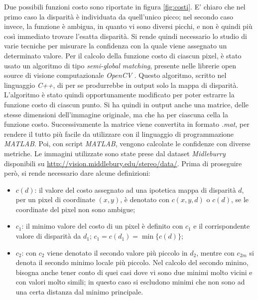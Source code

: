 \documentclass[12pt]{report}
\begin{document}
		\noindent Due possibili funzioni costo sono riportate in figura \ref{fig:costi}. E' chiaro che nel primo caso la disparità  è individuata da quell'unico picco; nel secondo caso invece, la funzione è ambigua, in quanto vi sono diversi picchi, e non è quindi più così immediato trovare l'esatta disparità. Si rende quindi necessario lo studio di varie tecniche per misurare la confidenza con la quale viene assegnato un determinato valore. Per il calcolo della funzione costo di ciascun pixel, è stato usato un algoritmo di tipo \textit{semi-global matching}, presente nelle librerie open source di visione computazionale \textit{OpenCV} \cite{opencv}. Questo algoritmo, scritto nel linguaggio \textit{C++}, di per se produrrebbe in output solo la mappa di disparità. L'algoritmo è stato quindi opportunamente modificato per poter estrarre la funzione costo di ciascun punto. Si ha quindi in output anche una matrice, delle stesse dimensioni dell'immagine originale, ma che ha per ciascuna cella la funzione costo. Successivamente la matrice viene convertita in formato \textit{.mat}, per rendere il tutto più facile da utilizzare con il linguaggio di programmazione \textit{MATLAB}. Poi, con script \textit{MATLAB}, vengono calcolate le confidenze con diverse metriche. Le immagini utilizzate sono state prese dal dataset \textit{Midleburry} \cite{dataset_2006_1,dataset_2006_2} disponibili su \url{http://vision.middlebury.edu/stereo/data/}. \newline
		Prima di proseguire però, si rende necessario dare alcune definizioni:  		
		
		\begin{itemize}
			\item $c(d)$: il valore del costo assegnato ad una ipotetica mappa di disparità $d$, per un pixel di coordinate $(x,y)$, è denotato con $c(x,y,d)$ o $c(d)$, se le coordinate del pixel non sono ambigue;
			
			\item $c_{1}$: il minimo valore del costo di un pixel è definito con $c_{1}$ e il corrispondente valore di disparità da $d_{1}$; $c_{1}=c(d_{1})=\min\{c(d)\}$;
			
			\item $c_{2}$: con $c_{2}$ viene denotato il secondo valore più piccolo in $d_{2}$, mentre con $c_{2m}$ si denota il secondo minimo locale più piccolo. Nel calcolo del secondo minino, bisogna anche tener conto di quei casi dove vi sono due minimi molto vicini e con valori molto simili; in questo caso si escludono minimi che non sono ad una certa distanza dal minimo principale.
			\label{item:definizioni}
		\end{itemize}
			
\end{document}

